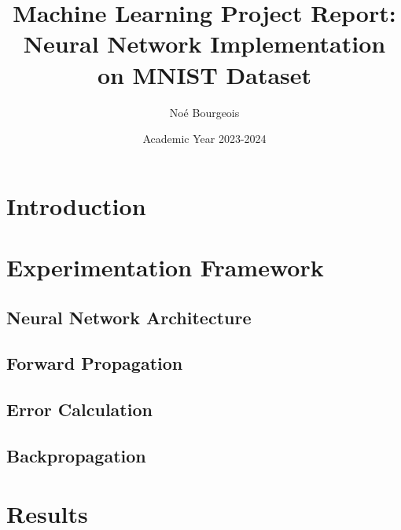 \documentclass{article}
\title{Machine Learning Project Report: Neural Network Implementation on MNIST Dataset}
\author{Noé Bourgeois}
\date{Academic Year 2023-2024}
\begin{document}
\maketitle

\begin{abstract}
\end{abstract}

\section{Introduction}

\section{Experimentation Framework}

\subsection{Neural Network Architecture}

\subsection{Forward Propagation}

\subsection{Error Calculation}

\subsection{Backpropagation}

\section{Results}
\end{document}
